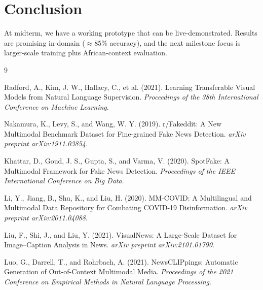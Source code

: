 \documentclass[a4paper,10.5pt,twoside]{article}
\begin{document}
\section{Conclusion}
At midterm, we have a working prototype that can be live-demonstrated.
Results are promising in-domain (\(\approx 85\%\) accuracy), and the next milestone focus is larger-scale training plus African-context evaluation.

\begin{thebibliography}{9}

Radford, A., Kim, J. W., Hallacy, C., et al. (2021).
Learning Transferable Visual Models from Natural Language Supervision.
\textit{Proceedings of the 38th International Conference on Machine Learning}.

Nakamura, K., Levy, S., and Wang, W. Y. (2019).
r/Fakeddit: A New Multimodal Benchmark Dataset for Fine-grained Fake News Detection.
\textit{arXiv preprint arXiv:1911.03854}.

Khattar, D., Goud, J. S., Gupta, S., and Varma, V. (2020).
SpotFake: A Multimodal Framework for Fake News Detection.
\textit{Proceedings of the IEEE International Conference on Big Data}.

Li, Y., Jiang, B., Shu, K., and Liu, H. (2020).
MM-COVID: A Multilingual and Multimodal Data Repository for Combating COVID-19 Disinformation.
\textit{arXiv preprint arXiv:2011.04088}.

Liu, F., Shi, J., and Liu, Y. (2021).
VisualNews: A Large-Scale Dataset for Image--Caption Analysis in News.
\textit{arXiv preprint arXiv:2101.01790}.

Luo, G., Darrell, T., and Rohrbach, A. (2021).
NewsCLIPpings: Automatic Generation of Out-of-Context Multimodal Media.
\textit{Proceedings of the 2021 Conference on Empirical Methods in Natural Language Processing}.

\end{thebibliography}
\end{document}
